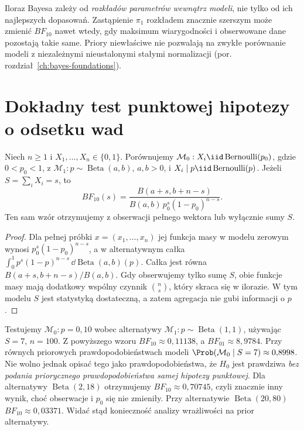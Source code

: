 \begin{uwaga}
Iloraz Bayesa zależy od \emph{rozkładów parametrów wewnątrz
modeli}, nie tylko od ich najlepszych dopasowań. Zastąpienie
$\pi_1$ rozkładem znacznie szerszym może zmienić
$BF_{10}$ nawet wtedy, gdy maksimum wiarygodności i
obserwowane dane pozostają takie same. Priory niewłaściwe
nie pozwalają na zwykłe porównanie modeli z niezależnymi
nieustalonymi stałymi normalizacji
(por. rozdział~\ref{ch:bayes-foundations}).
\end{uwaga}

\section{Dokładny test punktowej hipotezy o odsetku wad}
\begin{twierdzenie}
\label{thm:bernoulli-point-bf}
Niech $n\ge1$ i $X_1,\ldots,X_n\in\{0,1\}$. Porównujemy
$\mathcal M_0: X_i\iid\operatorname{Bernoulli}(p_0)$,
gdzie $0<p_0<1$, z
$\mathcal M_1: p\sim\operatorname{Beta}(a,b)$,
$a,b>0$, i $X_i\mid p\iid\operatorname{Bernoulli}(p)$.
Jeżeli $S=\sum_iX_i=s$, to
\[
BF_{10}(s)=\frac{B(a+s,b+n-s)}{B(a,b)\,p_0^s(1-p_0)^{n-s}}.
\]
Ten sam wzór otrzymujemy z obserwacji pełnego wektora
lub wyłącznie sumy $S$.
\end{twierdzenie}
\begin{proof}
Dla pełnej próbki $x=(x_1,\ldots,x_n)$ jej funkcja masy
w modelu zerowym wynosi
$p_0^s(1-p_0)^{n-s}$, a w alternatywnym całka
$\int_0^1p^s(1-p)^{n-s}\,\dd\operatorname{Beta}(a,b)(p)$.
Całka jest równa $B(a+s,b+n-s)/B(a,b)$.
Gdy obserwujemy tylko sumę $S$, obie funkcje masy mają
dodatkowy wspólny czynnik $\binom ns$, który skraca się
w ilorazie. W tym modelu $S$ jest statystyką dostateczną,
a zatem agregacja nie gubi informacji o $p$.
\end{proof}

\begin{przyklad}
Testujemy $\mathcal M_0:p=0{,}10$ wobec alternatywy
$\mathcal M_1:p\sim\operatorname{Beta}(1,1)$, używając
$S=7$, $n=100$. Z powyższego wzoru
$BF_{10}\approx0{,}11138$, a $BF_{01}\approx8{,}9784$.
Przy równych priorowych prawdopodobieństwach modeli
$\Prob(\mathcal M_0\mid S=7)\approx0{,}8998$.
Nie wolno jednak opisać tego jako prawdopodobieństwa, że
$H_0$ jest prawdziwa \emph{bez podania priorycznego
prawdopodobieństwa samej hipotezy punktowej}.
Dla alternatywy $\operatorname{Beta}(2,18)$ otrzymujemy
$BF_{10}\approx0{,}70745$, czyli znacznie inny wynik,
choć obserwacje i $p_0$ się nie zmieniły.
Przy alternatywie $\operatorname{Beta}(20,80)$
$BF_{10}\approx0{,}03371$. Widać stąd konieczność
analizy wrażliwości na prior alternatywy.
\end{przyklad}


